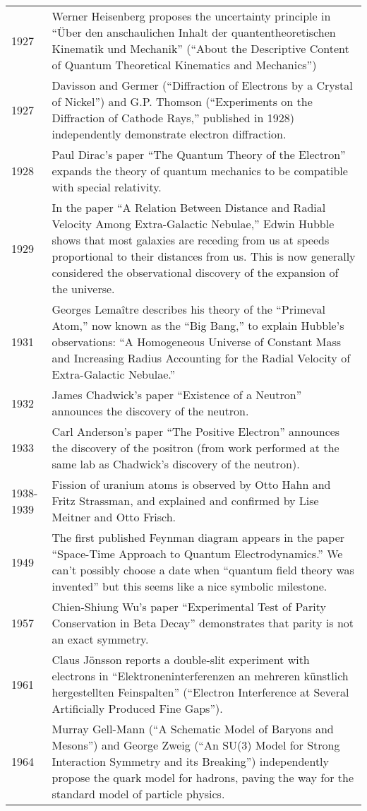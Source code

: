 \documentclass[../main.tex]{subfiles}
\begin{document}
\begin{center}
\begin{longtable}{p{}  p{}}
1927&Werner Heisenberg proposes the uncertainty principle in “Über den anschaulichen Inhalt der quantentheoretischen Kinematik und Mechanik” (“About the Descriptive Content of Quantum Theoretical Kinematics and Mechanics”)\\
1927&Davisson and Germer (“Diffraction of Electrons by a Crystal of Nickel”) and G.P. Thomson (“Experiments on the Diffraction of Cathode Rays,” published in 1928) independently demonstrate electron diffraction.\\
1928&Paul Dirac's paper “The Quantum Theory of the Electron” expands the theory of quantum mechanics to be compatible with special relativity.\\
1929&In the paper “A Relation Between Distance and Radial Velocity Among Extra-Galactic Nebulae,” Edwin Hubble shows that most galaxies are receding from us at speeds proportional to their distances from us. This is now generally considered the observational discovery of the expansion of the universe.\\
1931&Georges Lemaître describes his theory of the “Primeval Atom,” now known as the “Big Bang,” to explain Hubble's observations: “A Homogeneous Universe of Constant Mass and Increasing Radius Accounting for the Radial Velocity of Extra-Galactic Nebulae.”\\
1932&James Chadwick's paper “Existence of a Neutron” announces the discovery of the neutron.\\
1933&Carl Anderson's paper “The Positive Electron” announces the discovery of the positron (from work performed at the same lab as Chadwick's discovery of the neutron).\\
1938-1939&Fission of uranium atoms is observed by Otto Hahn and Fritz Strassman, and explained and confirmed by Lise Meitner and Otto Frisch. \\
1949&The first published Feynman diagram appears in the paper “Space-Time Approach to Quantum Electrodynamics.” We can't possibly choose a date when “quantum field theory was invented” but this seems like a nice symbolic milestone.\\
1957&Chien-Shiung Wu's paper “Experimental Test of Parity Conservation in Beta Decay” demonstrates that parity is not an exact symmetry.\\
1961&Claus Jönsson reports a double-slit experiment with electrons in “Elektroneninterferenzen an mehreren künstlich hergestellten Feinspalten” (“Electron Interference at Several Artificially Produced Fine Gaps”).\\
1964&Murray Gell-Mann (“A Schematic Model of Baryons and Mesons”) and George Zweig (“An SU(3) Model for Strong Interaction Symmetry and its Breaking”) independently propose the quark model for hadrons, paving the way for the standard model of particle physics.\\

\end{longtable}
\end{center}
\end{document}
